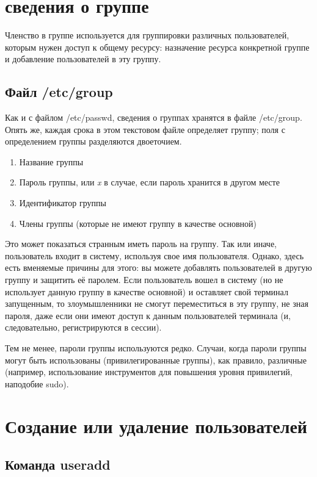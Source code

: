 \documentclass[10pt]{book}
\begin{document}
\section{сведения о группе}

Членство в группе используется для группировки различных пользователей, которым нужен доступ к общему ресурсу: назначение ресурса конкретной группе и добавление пользователей в эту группу.

\subsection{Файл /etc/group}

Как и с файлом /etc/passwd, сведения о группах хранятся в файле /etc/group. Опять же, каждая срока
в этом текстовом файле определяет группу; поля с определением группы разделяются двоеточием.
\begin{enumerate}
 \item Название группы
 \item Пароль группы, или \textit{x} в случае, если пароль хранится в другом месте
 \item Идентификатор группы
 \item Члены группы (которые не имеют группу в качестве основной)
\end{enumerate}

Это может показаться странным иметь пароль на группу. Так или иначе, пользователь входит в систему, используя свое имя пользователя. Однако, здесь есть вменяемые причины для этого: вы можете добавлять пользователей в другую группу и защитить её паролем. Если пользователь вошел в систему (но не использует данную группу в качестве основной) и оставляет свой терминал запущенным, то злоумышленники не смогут переместиться в эту группу, не зная пароля, даже если они имеют доступ к данным пользователей терминала (и, следовательно, регистрируются в сессии). 

Тем не менее, пароли группы используются редко. Случаи, когда пароли группы могут быть использованы (привилегированные группы), как правило, различные (например, использование инструментов для повышения уровня привилегий, наподобие sudo).

\section{Создание или удаление пользователей}
\subsection{Команда useradd}
\end{document}
